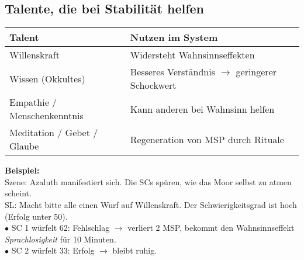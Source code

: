 \subsection{Talente, die bei Stabilität helfen}
\begin{center}
\begin{tabular}{ll}
\toprule
\textbf{Talent} & \textbf{Nutzen im System} \\ 
\midrule 
Willenskraft & Widersteht Wahnsinnseffekten \\ 
\midrule 
Wissen (Okkultes) & Besseres Verständnis $\rightarrow$ geringerer Schockwert \\ 
\midrule 
Empathie / Menschenkenntnis & Kann anderen bei Wahnsinn helfen \\ 
\midrule 
Meditation / Gebet / Glaube & Regeneration von MSP durch Rituale \\ 
\bottomrule
\end{tabular} 
\end{center}
\textbf{Beispiel:}\\
Szene: Azaluth manifestiert sich. Die SCs spüren, wie das Moor selbst zu atmen scheint.\\
SL: Macht bitte alle einen Wurf auf Willenskraft. Der Schwierigkeitsgrad ist hoch (Erfolg unter 50).\\
$\bullet$ SC 1 würfelt 62: Fehlschlag $\rightarrow$ verliert 2 MSP, bekommt den Wahnsinnseffekt \textit{Sprachlosigkeit} für 10 Minuten.\\
$\bullet$ SC 2 würfelt 33: Erfolg $\rightarrow$ bleibt ruhig.
